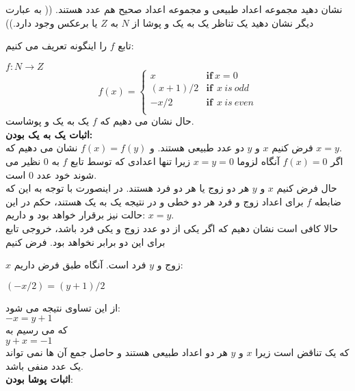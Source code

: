 
نشان دهید مجموعه اعداد طبیعی و مجموعه اعداد صحیح هم عدد هستند. (( به عبارت دیگر نشان دهید یک تناظر یک به یک و پوشا از  
$N$
به 
$Z$
یا برعکس وجود دارد.))
\begin{ans}
    تابع 
    $f$
    را اینگونه تعریف می کنیم:

    $f:N\xrightarrow{} Z$
    \[
    f(x) = 
    \begin{cases}
        x & \textbf{if} \ x = 0\\
        (x+1)/2 & \textbf{if} \ \ x \ is \ odd\\
        -x/2 & \textbf{if} \ \ x \ is \ even\\
    \end{cases}
    \]
    حال نشان می دهیم که 
    $f$
    یک به یک و پوشاست.
    \\
    \textbf{اثبات یک به یک بودن:}\\
    فرض کنیم 
    $x$
    و
    $y$
    دو عدد طبیعی هستند. و 
    $f(x) = f(y)$
    نشان می دهیم که 
    $x = y$.
    \\
    اگر 
    $f(x) = 0$
    آنگاه لزوما
    $x = y = 0$
    زیرا تنها اعدادی که توسط تابع 
    $f$
    به 
    $0$
    نظیر می شوند خود عدد 
    $0$
    است.
    \\
    حال فرض کنیم 
    $x$
    و
    $y$
    هر دو زوج یا هر دو فرد هستند. در اینصورت با توجه به این که ضابطه 
    $f$
    برای اعداد زوج و فرد هر دو خطی و در نتیجه یک به یک هستند، حکم در این حالت نیز برقرار خواهد بود و داریم:
    $x = y$.
    \\
    حالا کافی است نشان دهیم که اگر یکی از دو عدد زوج و یکی فرد باشد، خروجی تابع برای این دو برابر نخواهد بود. فرض کنیم 
    
    $x$
    زوج و
    $y$
    فرد است. آنگاه طبق فرض داریم:

    $(-x/2) = (y+1)/2$

    از این تساوی نتیجه می شود:\\
    $-x = y+1$
    \\
    که می رسیم به
    \\
    $y+x = -1$
    \\
    که یک تناقض است زیرا
    $x$
    و
    $y$
    هر دو اعداد طبیعی هستند و حاصل جمع آن ها نمی تواند یک عدد منفی باشد.
    \\
    \textbf{اثبات پوشا بودن}:\\


\end{ans}
